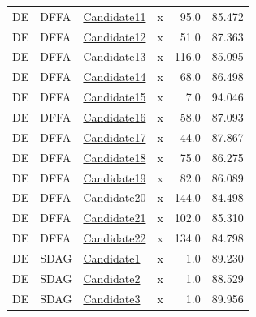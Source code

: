 \documentclass{article}
\begin{document}
\begin{longtable}{llllrr}
DE&DFFA &\href{C:/Users/hootanz/eclipse-workspace/processICPM/20251209_205430/DFFA/DE/candidate11.dffa}{Candidate11} & x &95.0&85.472\\
DE&DFFA &\href{C:/Users/hootanz/eclipse-workspace/processICPM/20251209_205430/DFFA/DE/candidate12.dffa}{Candidate12} & x &51.0&87.363\\
DE&DFFA &\href{C:/Users/hootanz/eclipse-workspace/processICPM/20251209_205430/DFFA/DE/candidate13.dffa}{Candidate13} & x &116.0&85.095\\
DE&DFFA &\href{C:/Users/hootanz/eclipse-workspace/processICPM/20251209_205430/DFFA/DE/candidate14.dffa}{Candidate14} & x &68.0&86.498\\
DE&DFFA &\href{C:/Users/hootanz/eclipse-workspace/processICPM/20251209_205430/DFFA/DE/candidate15.dffa}{Candidate15} & x &7.0&94.046\\
DE&DFFA &\href{C:/Users/hootanz/eclipse-workspace/processICPM/20251209_205430/DFFA/DE/candidate16.dffa}{Candidate16} & x &58.0&87.093\\
DE&DFFA &\href{C:/Users/hootanz/eclipse-workspace/processICPM/20251209_205430/DFFA/DE/candidate17.dffa}{Candidate17} & x &44.0&87.867\\
DE&DFFA &\href{C:/Users/hootanz/eclipse-workspace/processICPM/20251209_205430/DFFA/DE/candidate18.dffa}{Candidate18} & x &75.0&86.275\\
DE&DFFA &\href{C:/Users/hootanz/eclipse-workspace/processICPM/20251209_205430/DFFA/DE/candidate19.dffa}{Candidate19} & x &82.0&86.089\\
DE&DFFA &\href{C:/Users/hootanz/eclipse-workspace/processICPM/20251209_205430/DFFA/DE/candidate20.dffa}{Candidate20} & x &144.0&84.498\\
DE&DFFA &\href{C:/Users/hootanz/eclipse-workspace/processICPM/20251209_205430/DFFA/DE/candidate21.dffa}{Candidate21} & x &102.0&85.310\\
DE&DFFA &\href{C:/Users/hootanz/eclipse-workspace/processICPM/20251209_205430/DFFA/DE/candidate22.dffa}{Candidate22} & x &134.0&84.798\\
DE&SDAG &\href{C:/Users/hootanz/eclipse-workspace/processICPM/20251209_205430/SDAG/DE/candidate1.sdag}{Candidate1} & x &1.0&89.230\\
DE&SDAG &\href{C:/Users/hootanz/eclipse-workspace/processICPM/20251209_205430/SDAG/DE/candidate2.sdag}{Candidate2} & x &1.0&88.529\\
DE&SDAG &\href{C:/Users/hootanz/eclipse-workspace/processICPM/20251209_205430/SDAG/DE/candidate3.sdag}{Candidate3} & x &1.0&89.956\\

\end{longtable}
\end{document}

